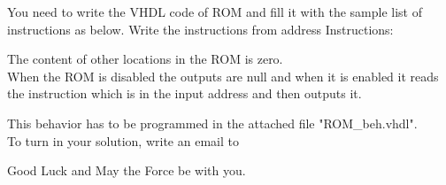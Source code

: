 \documentclass[a4paper,12pt]{article}
\begin{document}
You need to write the VHDL code of ROM and fill it with the sample list of instructions as below. Write the instructions from address %
Instructions:
\begin{center}
\end{center}

The content of other locations in the ROM is zero.
\\

When the ROM is disabled the outputs are null and when it is enabled it reads the instruction which is in the input address and then outputs it. 

This behavior has to be programmed in the attached file "ROM\_beh.vhdl".\\

To turn in your solution, write an email to %

\vspace{0.7cm}

Good Luck and May the Force be with you.
\end{document}
